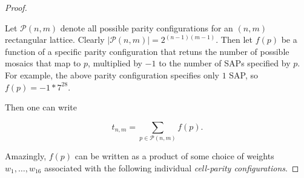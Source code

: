 \documentclass[12pt]{article}
\theoremstyle{plain}
\theoremstyle{definition}
\theoremstyle{remark}
\theoremstyle{definition}
\begin{document}
\begin{proof}
\begin{center}
\end{center}

Let $\mathcal{P} (n,m)$ denote all possible parity configurations for an $(n,m)$ rectangular lattice. Clearly $|\mathcal{P} (n,m)| = 2^{(n-1)(m-1)}$. Then let $f(p)$ be a function of a specific parity configuration that retuns the number of possible mosaics that map to $p$, multiplied by $-1$ to the number of SAPs specified by $p$. For example, the above parity configuration specifies only $1$ SAP, so $f(p) = -1 * 7^{28}$. 

Then one can write

$$t_{n,m} = \sum_{p \in \mathcal{P}(n,m)}f(p).$$

Amazingly, $f(p)$ can be written as a product of some choice of weights $w_{1} , \dots, w_{16}$ associated with the following individual \textit{cell-parity configurations}.


\end{proof}
\end{document}
